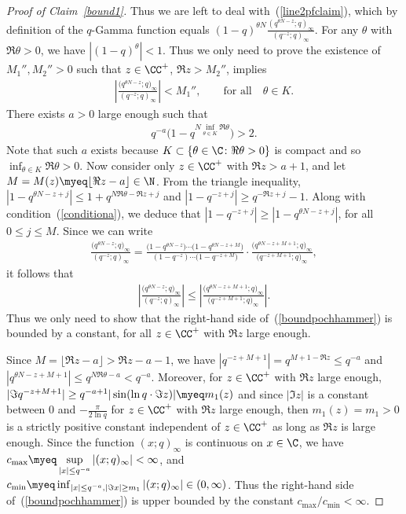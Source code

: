 \begin{proof}[Proof of Claim~\ref{bound1}]
Thus we are left to deal with~(\ref{line2pfclaim}), which by def\/inition of the $q$-Gamma function equals $(1 - q)^{\theta N}\frac{(q^{\theta N - z}; q)_{\infty}}{(q^{-z}; q)_{\infty}}$. For any $\theta$ with $\Re\theta > 0$, we have $|(1 - q)^{\theta}| < 1$. Thus we only need to prove the existence of $M_1'', M_2'' > 0$ such that $z\in\CC^+$, $\Re z > M_2''$, implies
\begin{gather}\label{boundthetaN}
\left| \frac{\big(q^{\theta N - z}; q\big)_{\infty}}{(q^{-z}; q)_{\infty}} \right| < M_1'',\qquad \textrm{for all} \quad \theta\in K.
\end{gather}
There exists $a > 0$ large enough such that
\begin{gather}\label{conditiona}
q^{-a} \big( 1 - q^{N\inf_{\theta\in K}{\Re \theta}} \big) > 2.
\end{gather}
Note that such $a$ exists because $K \subset \{\theta\in\C\colon \Re\theta > 0\}$ is compact and so $\inf_{\theta\in K}{\Re \theta} > 0$. Now consider only $z\in\CC^+$ with $\Re z > a+1$, and let $M = M(z) \myeq \lfloor \Re z - a \rfloor\in\N$. From the triangle inequality, $|1 - q^{\theta N - z + j}| \leq 1 + q^{N\Re\theta - \Re z + j}$ and $|1 - q^{-z+j}| \geq q^{-\Re z + j} - 1$. Along with condition~(\ref{conditiona}), we deduce that $|1 - q^{-z+j}| \geq |1 - q^{\theta N - z + j}|$, for all $0\leq j\leq M$. Since we can write
\begin{gather*}
\frac{\big(q^{\theta N - z}; q\big)_{\infty}}{(q^{- z}; q)_{\infty}} = \frac{\big(1 - q^{\theta N - z}\big)\cdots \big(1 - q^{\theta N - z + M}\big)}{(1 - q^{- z})\cdots \big(1 - q^{- z + M}\big)}\cdot\frac{\big(q^{\theta N - z + M + 1}; q\big)_{\infty}}{\big(q^{- z + M + 1}; q\big)_{\infty}},
\end{gather*}
it follows that
\begin{gather}\label{boundpochhammer}
\left| \frac{\big(q^{\theta N - z}; q\big)_{\infty}}{(q^{- z}; q)_{\infty}} \right| \leq \left| \frac{\big(q^{\theta N - z + M + 1}; q\big)_{\infty}}{\big(q^{- z + M + 1}; q\big)_{\infty}} \right|.
\end{gather}
Thus we only need to show that the right-hand side of~(\ref{boundpochhammer}) is bounded by a constant, for all $z\in\CC^+$ with $\Re z$ large enough.

Since $M = \lfloor \Re z - a \rfloor > \Re z - a -1$, we have $|q^{-z + M + 1}| = q^{M + 1 - \Re z} \leq q^{-a}$ and $|q^{\theta N - z + M + 1}| \leq q^{N\Re\theta - a} < q^{-a}$. Moreover, for $z\in\CC^+$ with $\Re z$ large enough, $|\Im q^{-z+M+1}| \geq q^{-a+1}|\sin(\ln{q}\cdot \Im z)| \myeq m_1(z)$ and since $|\Im z|$ is a constant between $0$ and $-\frac{\pi}{2\ln{q}}$ for $z\in\CC^+$ with $\Re z$ large enough, then $m_1(z) = m_1 > 0$ is a strictly positive constant independent of $z\in\CC^+$ as long as $\Re z$ is large enough. Since the function $(x; q)_{\infty}$ is continuous on $x\in\C$, we have $c_{\max} \myeq \sup\limits_{|x| \leq q^{-a}}{|(x; q)_{\infty}|} < \infty$, and $c_{\min} \myeq \inf_{|x|\leq q^{-a}, |\Im x| \geq m_1}{|(x; q)_{\infty}|} \in (0, \infty)$. Thus the right-hand side of~(\ref{boundpochhammer}) is upper bounded by the constant $c_{\max}/c_{\min} < \infty$.
\end{proof}

